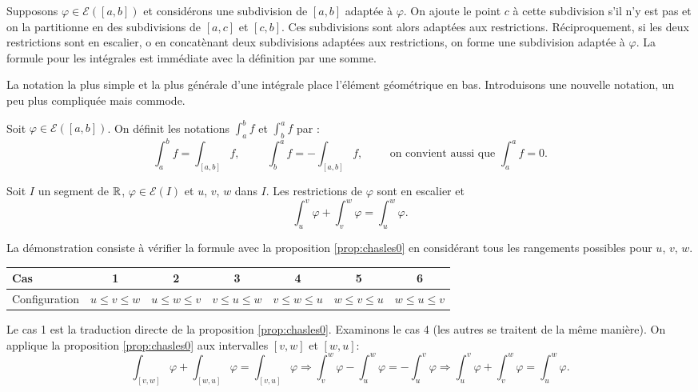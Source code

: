 \begin{demo}
 Supposons $\varphi \in \mathcal{E}([a,b])$ et considérons une subdivision de $[a,b]$ adaptée à $\varphi$. On ajoute le point $c$ à cette subdivision s'il n'y est pas et on la partitionne en des subdivisions de $[a,c]$ et $[c,b]$. Ces subdivisions sont alors adaptées aux restrictions.\newline
 Réciproquement, si les deux restrictions sont en escalier, o
en concatènant deux subdivisions adaptées aux restrictions, on forme une subdivision adaptée à $\varphi$. La formule pour les intégrales est immédiate avec la définition par une somme.
\end{demo}
La notation la plus simple et la plus générale d'une intégrale place l'élément géométrique en bas. Introduisons une nouvelle notation, un peu plus compliquée mais commode.
\begin{nota}
 Soit $\varphi \in \mathcal{E}([a,b])$. On définit les notations $\int_{a}^{b}f$ et $\int_{b}^{a}f$ par :
\[
 \int_{a}^{b}f = \int_{[a,b]}f , \hspace{1cm} \int_{b}^{a}f = -\int_{[a,b]}f,\hspace{1cm}\text{on convient aussi que } \int_{a}^{a}f = 0.
\]
\end{nota}
\begin{propn}\label{prop:chasles}
 Soit $I$ un segment de $\mathbb{R}$, $\varphi \in \mathcal{E}(I)$ et $u$, $v$, $w$ dans $I$. Les restrictions de $\varphi$ sont en escalier et
\[
 \int_u^v \varphi + \int_v^w\varphi = \int_u^w \varphi.
\]
\end{propn}
\begin{demo}
 La démonstration consiste à vérifier la formule avec la proposition \ref{prop:chasles0} en considérant tous les rangements possibles pour $u$, $v$, $w$.
\begin{center}
\renewcommand{\arraystretch}{1.2}
\begin{tabular}{|l|c|c|c|c|c|c|} \hline
Cas           & 1                 & 2                 & 3                 & 4                 & 5                 & 6 \\ \hline
Configuration & $u \leq v \leq w$ & $u \leq w \leq v$ & $v \leq u \leq w$ & $v \leq w \leq u$ & $w \leq v \leq u$ & $w \leq u \leq v$ \\ \hline
\end{tabular}
\end{center}
Le cas 1 est la traduction directe de la proposition \ref{prop:chasles0}.\newline
Examinons le cas 4 (les autres se traitent de la même manière). On applique la proposition \ref{prop:chasles0} aux intervalles $[v,w]$ et $[w,u]$:
\[
\int_{[v,w]}\varphi +  \int_{[w,u]}\varphi = \int_{[v,u]}\varphi 
\Rightarrow
\int_{v}^{w}\varphi - \int_{u}^{w}\varphi = -\int_{u}^{v}\varphi
\Rightarrow 
\int_{u}^{v}\varphi + \int_{v}^{w}\varphi = \int_{u}^{w}\varphi.
\]
\end{demo}

